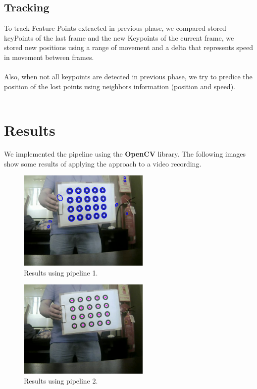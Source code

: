 \documentclass[journal]{IEEEtran}
\begin{document}
\subsection{Tracking}
To track Feature Points extracted in previous phase, we compared stored keyPoints of the last frame and the new Keypoints of the current frame, we stored new positions using a range of movement and a delta that represents speed in movement between frames.
\\
\\
Also, when not all keypoints are detected in previous phase, we try to predice the position of the lost points using neighbors information (position and speed).
\\
\\


\section{Results}
We implemented the pipeline using the \textbf{OpenCV} library. The following images show some results of applying the approach to a video recording.

\begin{figure}[H]
\centering
\includegraphics[width=2.5in]{_img/img_results_p1.png}
\caption{Results using pipeline 1.}
\end{figure}
%
\begin{figure}[H]
\centering
\includegraphics[width=2.5in]{_img/img_results_p2.png}
\caption{Results using pipeline 2.}
\end{figure}
%
\end{document}
